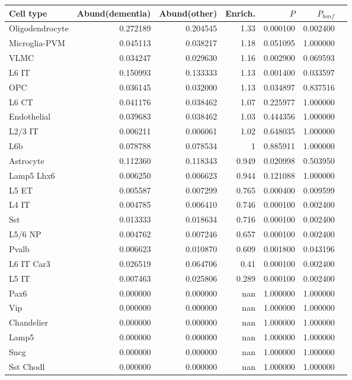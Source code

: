 \begin{tabular}{lrrrrrl}
\toprule
\bfseries Cell type & \bfseries Abund(dementia) & \bfseries Abund(other) & \bfseries Enrich. & \bfseries $P$ & \bfseries $P_{bonf}$ &  \\
\midrule
Oligodendrocyte & 0.272189 & 0.204545 & 1.33 & 0.000100 & 0.002400 &  \\
Microglia-PVM & 0.045113 & 0.038217 & 1.18 & 0.051095 & 1.000000 &  \\
VLMC & 0.034247 & 0.029630 & 1.16 & 0.002900 & 0.069593 &  \\
L6 IT & 0.150993 & 0.133333 & 1.13 & 0.001400 & 0.033597 &  \\
OPC & 0.036145 & 0.032000 & 1.13 & 0.034897 & 0.837516 &  \\
L6 CT & 0.041176 & 0.038462 & 1.07 & 0.225977 & 1.000000 &  \\
Endothelial & 0.039683 & 0.038462 & 1.03 & 0.444356 & 1.000000 &  \\
L2/3 IT & 0.006211 & 0.006061 & 1.02 & 0.648035 & 1.000000 &  \\
L6b & 0.078788 & 0.078534 & 1 & 0.885911 & 1.000000 &  \\
Astrocyte & 0.112360 & 0.118343 & 0.949 & 0.020998 & 0.503950 &  \\
Lamp5 Lhx6 & 0.006250 & 0.006623 & 0.944 & 0.121088 & 1.000000 &  \\
L5 ET & 0.005587 & 0.007299 & 0.765 & 0.000400 & 0.009599 &  \\
L4 IT & 0.004785 & 0.006410 & 0.746 & 0.000100 & 0.002400 &  \\
Sst & 0.013333 & 0.018634 & 0.716 & 0.000100 & 0.002400 &  \\
L5/6 NP & 0.004762 & 0.007246 & 0.657 & 0.000100 & 0.002400 &  \\
Pvalb & 0.006623 & 0.010870 & 0.609 & 0.001800 & 0.043196 &  \\
L6 IT Car3 & 0.026519 & 0.064706 & 0.41 & 0.000100 & 0.002400 &  \\
L5 IT & 0.007463 & 0.025806 & 0.289 & 0.000100 & 0.002400 &  \\
Pax6 & 0.000000 & 0.000000 & nan & 1.000000 & 1.000000 &  \\
Vip & 0.000000 & 0.000000 & nan & 1.000000 & 1.000000 &  \\
Chandelier & 0.000000 & 0.000000 & nan & 1.000000 & 1.000000 &  \\
Lamp5 & 0.000000 & 0.000000 & nan & 1.000000 & 1.000000 &  \\
Sncg & 0.000000 & 0.000000 & nan & 1.000000 & 1.000000 &  \\
Sst Chodl & 0.000000 & 0.000000 & nan & 1.000000 & 1.000000 &  \\
\bottomrule
\end{tabular}
